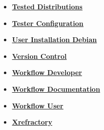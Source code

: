 \documentclass[12pt]{article}
\begin{document}
\begin{itemize}
\item \href{../tested-distributions/tested-distributions.pdf}{\bf \underline{Tested Distributions}}

\item \href{../tester-configuration/tester-configuration.pdf}{\bf \underline{Tester Configuration}}

\item \href{../installation-debian/installation-debian.pdf}{\bf \underline{User Installation Debian}}

\item \href{../version-control/version-control.pdf}{\bf \underline{Version Control}}

\item \href{../workflow-developer/workflow-developer.pdf}{\bf \underline{Workflow Developer}}

\item \href{../workflow-documentation/workflow-documentation.pdf}{\bf \underline{Workflow Documentation}}

\item \href{../workflow-user/workflow-user.pdf}{\bf \underline{Workflow User}}

\item \href{../cxref/cxref.pdf}{\bf \underline{Xrefractory}}


\end{itemize}

\end{document}
